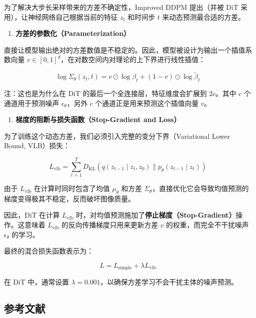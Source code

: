 为了解决大步长采样带来的方差不确定性，Improved DDPM 提出（并被 DiT 采用），让神经网络自己根据当前的特征 \(z_t\) 和时间步 \(t\) 来动态预测最合适的方差。

\begin{enumerate}
\def\labelenumi{\arabic{enumi}.}
\tightlist
\item
  \textbf{方差的参数化（Parameterization）}
\end{enumerate}

直接让模型输出绝对的方差数值是不稳定的。因此，模型被设计为输出一个插值系数向量 \(v\in[0,1]^d\)，在对数空间内对理论的上下界进行线性插值：

\[
\log\Sigma_\theta(z_t,t)=v\odot\log\beta_t+(1-v)\odot\log\tilde{\beta}_t
\]

注：这也是为什么在 DiT 的最后一个全连接层，特征维度会扩展到 \(2c\)。其中 \(c\) 个通道用于预测噪声 \(\epsilon_\theta\)，另外 \(c\) 个通道正是用来预测这个插值向量 \(v\)。

\begin{enumerate}
\def\labelenumi{\arabic{enumi}.}
\setcounter{enumi}{1}
\tightlist
\item
  \textbf{梯度的阻断与损失函数（Stop-Gradient and Loss）}
\end{enumerate}

为了训练这个动态方差，我们必须引入完整的变分下界（Variational Lower Bound, VLB）损失：

\[
L_{\mathrm{vlb}}=\sum_{t=1}^{T}D_{\mathrm{KL}}\left(q(z_{t-1}\mid z_t,z_0)\parallel p_\theta(z_{t-1}\mid z_t)\right)
\]

由于 \(L_{\mathrm{vlb}}\) 在计算时同时包含了均值 \(\mu_\theta\) 和方差 \(\Sigma_\theta\)，直接优化它会导致均值预测的梯度变得极其不稳定，反而破坏图像质量。

因此，DiT 在计算 \(L_{\mathrm{vlb}}\) 时，对均值预测施加了\textbf{停止梯度（Stop-Gradient）}操作。这意味着 \(L_{\mathrm{vlb}}\) 的反向传播梯度只用来更新方差 \(v\) 的权重，而完全不干扰噪声 \(\epsilon_\theta\) 的学习。

最终的混合损失函数表示为：

\[
L=L_{\mathrm{simple}}+\lambda L_{\mathrm{vlb}}
\]

在 DiT 中，通常设置 \(\lambda=0.001\)，以确保方差学习不会干扰主体的噪声预测。

\FloatBarrier
{}
\hypertarget{ux53c2ux8003ux6587ux732e-131}{%
\subsection{参考文献}\label{ux53c2ux8003ux6587ux732e-131}}

